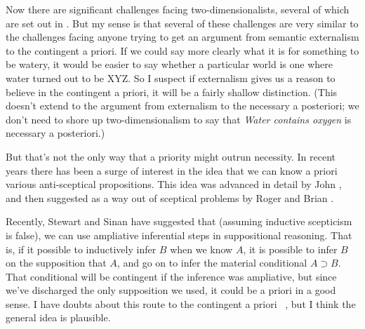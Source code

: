 Now there are significant challenges facing two-dimensionalists, several of which are set out in  \citet{Block1999-BLOCAD}. But my sense is that several of these challenges are very similar to the challenges facing anyone trying to get an argument from semantic externalism to the contingent a priori. If we could say more clearly what it is for something to be watery, it would be easier to say whether a particular world is one where water turned out to be XYZ. So I suspect if externalism gives us a reason to believe in the contingent a priori, it will be a fairly shallow distinction. (This doesn't extend to the argument from externalism to the necessary a posteriori; we don't need to shore up two-dimensionalism to say that \emph{Water contains oxygen} is necessary a posteriori.)

But that's not the only way that a priority might outrun necessity. In recent years there has been a surge of interest in the idea that we can know a priori various anti-sceptical propositions. This idea was advanced in detail by John  \citet{Hawthorne2002}, and then suggested as a way out of sceptical problems by Roger  \citet{White2006} and Brian  \citet{WeathersonSRE}. 

Recently, Stewart  \citet{Cohen2010} and Sinan  \citet{Dogramaci2010} have suggested that (assuming inductive scepticism is false), we can use ampliative inferential steps in suppositional reasoning. That is, if it possible to inductively infer $B$ when we know $A$, it is possible to infer $B$ on the supposition that $A$, and go on to infer the material conditional $A \supset B$. That conditional will be contingent if the inference was ampliative, but since we've discharged the only supposition we used, it could be a priori in a good sense. I have doubts about this route to the contingent a priori ~\citep{Weatherson2012-WEAIAS}, but I think the general idea is plausible.

